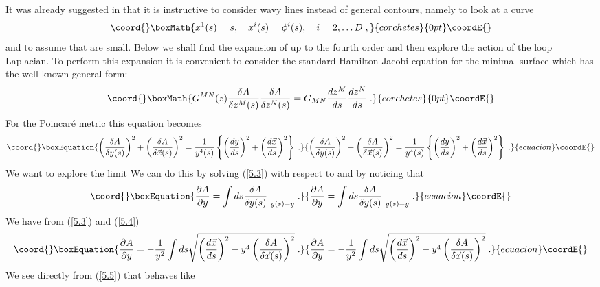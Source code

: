 \documentclass[a4paper,12pt]{article}
\numberwithin{equation}{section}
\begin{document}
It was already suggested in \cite{1} that it is instructive to consider wavy
lines instead of general contours, namely to look at a curve
\[\coord{}\boxMath{
x^{1}(s)=s,\quad x^{i}(s)=\phi ^{i}(s),\quad i=2,\ldots D\; ,}{corchetes}{0pt}\coordE{}\]
 and to assume that \coordHE{} are small. Below we shall find the expansion
of \coordHE{} up to the fourth order and then explore
the action of the loop Laplacian. To perform this expansion it is convenient
to consider the standard Hamilton-Jacobi equation for the minimal surface which
has the well-known general form:
\[\coord{}\boxMath{
G^{MN}(z)\frac{\delta A}{\delta z^{M}(s)}\frac{\delta A}{\delta z^{N}(s)}=G_{MN}\frac{dz^{M}}{ds}\frac{dz^{N}}{ds}\; .}{corchetes}{0pt}\coordE{}\]
 For the Poincar\'e metric this equation becomes
\begin{equation}\coord{}\boxEquation{
\label{5.3}
\left( \frac{\delta A}{\delta y(s)}\right) ^{2}+\left( \frac{\delta A}{\delta \vec{x}(s)}\right) ^{2}=\frac{1}{y^{4}(s)}\left\{ \left( \frac{dy}{ds}\right) ^{2}+\left( \frac{d\vec{x}}{ds}\right) ^{2}\right\} \; .
}{
\left( \frac{\delta A}{\delta y(s)}\right) ^{2}+\left( \frac{\delta A}{\delta \vec{x}(s)}\right) ^{2}=\frac{1}{y^{4}(s)}\left\{ \left( \frac{dy}{ds}\right) ^{2}+\left( \frac{d\vec{x}}{ds}\right) ^{2}\right\} \; .
}{ecuacion}\coordE{}\end{equation}
 We want to explore the limit \coordHE{} We can do this by solving
(\ref{5.3}) with respect to \coordHE{} and by noticing
that
\begin{equation}\coord{}\boxEquation{
\label{5.4}
\frac{\partial A}{\partial y}=\int ds\frac{\delta A}{\delta y(s)}\Bigl |_{y(s)=y}\; .
}{
\frac{\partial A}{\partial y}=\int ds\frac{\delta A}{\delta y(s)}\Bigl |_{y(s)=y}\; .
}{ecuacion}\coordE{}\end{equation}
 We have from (\ref{5.3}) and (\ref{5.4})
\begin{equation}\coord{}\boxEquation{
\label{5.5}
\frac{\partial A}{\partial y}=-\frac{1}{y^{2}}\int ds\sqrt{{\left( \frac{d\vec{x}}{ds}\right) ^{2}-y^{4}\left( \frac{\delta A}{\delta \vec{x}(s)}\right) ^{2}}}\; .
}{
\frac{\partial A}{\partial y}=-\frac{1}{y^{2}}\int ds\sqrt{{\left( \frac{d\vec{x}}{ds}\right) ^{2}-y^{4}\left( \frac{\delta A}{\delta \vec{x}(s)}\right) ^{2}}}\; .
}{ecuacion}\coordE{}\end{equation}
 We see directly from (\ref{5.5}) that \coordHE{} behaves like
\end{document}

